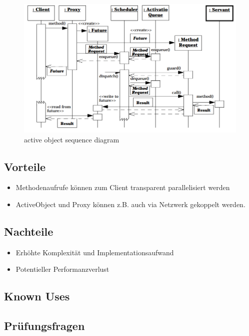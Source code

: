 \begin{figure}[H]
	\centering
	\includegraphics[width=\textwidth]{content/posa2/active-object/images/act-obj_sequence-diagram.png}
	\caption{active object sequence diagram}
\end{figure}




\subsection*{Vorteile}


\begin{itemize}
	\item Methodenaufrufe können zum Client transparent parallelisiert werden
	\item ActiveObject und Proxy können z.B. auch via Netzwerk gekoppelt werden.
\end{itemize}

\subsection*{Nachteile}


\begin{itemize}
	\item Erhöhte Komplexität und Implementationsaufwand
	\item Potentieller Performanzverlust
\end{itemize}

\subsection*{Known Uses}


\subsection*{Prüfungsfragen}


